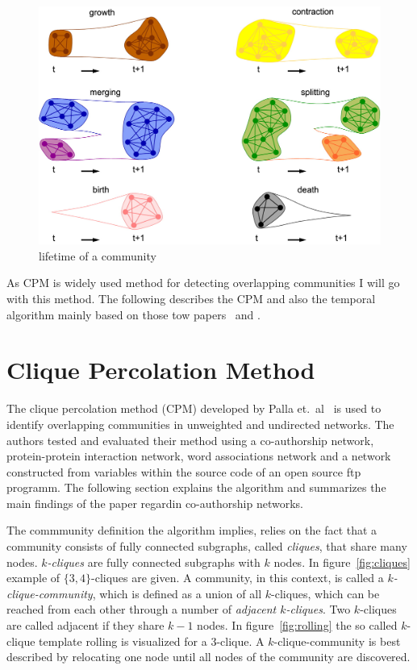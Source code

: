 \documentclass[runningheads,a4paper]{llncs}
\begin{document}
\begin{figure}
	\includegraphics[width=\textwidth]{villsize.jpg}
	\caption{lifetime of a community}
	\label{fig:evolution}
\end{figure}

As CPM is widely used method for detecting overlapping communities I will go with this method. The following describes the CPM and also the temporal algorithm mainly based on those tow papers~\cite{palla2005uncovering} and \cite{palla2007quantifying}.

\section{Clique Percolation Method}
\label{cpm}
The clique percolation method (CPM) developed by Palla et.~al~\cite{palla2007quantifying} is used to identify overlapping communities in unweighted and undirected networks.
The authors tested and evaluated their method using a co-authorship network, protein-protein interaction network, word associations network and a network constructed from variables within the source code of an open source ftp programm.
The following section explains the algorithm and summarizes the main findings of the paper regardin co-authorship networks.

The commmunity definition the algorithm implies, relies on the fact that a community consists of fully connected subgraphs, called \emph{cliques}, that share many nodes.
\emph{$k$-cliques} are fully connected subgraphs with $k$ nodes.
In figure~\ref{fig:cliques} example of $\{3,4\}$-cliques are given.
A community, in this context, is called a \emph{$k$-clique-community}, which is defined as a union of all $k$-cliques, which can be reached from each other through a number of \emph{adjacent $k$-cliques}.
Two $k$-cliques are called adjacent if they share $k-1$ nodes.
In figure~\ref{fig:rolling} the so called $k$-clique template rolling is visualized for a $3$-clique.
A $k$-clique-community is best described by relocating one node until all nodes of the community are discovered.
\end{document}
